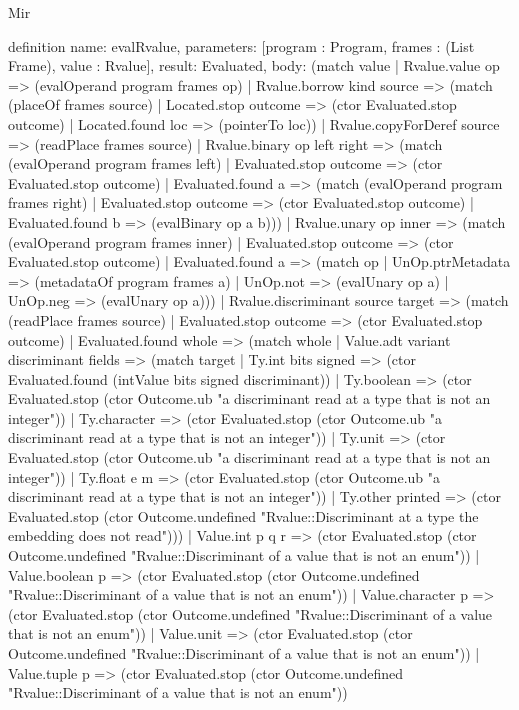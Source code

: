 \begin{lexlean}{Mir}
\begin{semanticmodule}
definition{
  name: evalRvalue,
  parameters: [program : Program, frames : (List Frame), value : Rvalue],
  result: Evaluated,
  body: (match value
    | Rvalue.value op => (evalOperand program frames op)
    | Rvalue.borrow kind source => (match (placeOf frames source)
      | Located.stop outcome => (ctor Evaluated.stop outcome)
      | Located.found loc => (pointerTo loc))
    | Rvalue.copyForDeref source => (readPlace frames source)
    | Rvalue.binary op left right => (match (evalOperand program frames left)
      | Evaluated.stop outcome => (ctor Evaluated.stop outcome)
      | Evaluated.found a => (match (evalOperand program frames right)
        | Evaluated.stop outcome => (ctor Evaluated.stop outcome)
        | Evaluated.found b => (evalBinary op a b)))
    | Rvalue.unary op inner => (match (evalOperand program frames inner)
      | Evaluated.stop outcome => (ctor Evaluated.stop outcome)
      | Evaluated.found a => (match op
        | UnOp.ptrMetadata => (metadataOf program frames a)
        | UnOp.not => (evalUnary op a)
        | UnOp.neg => (evalUnary op a)))
    | Rvalue.discriminant source target => (match (readPlace frames source)
      | Evaluated.stop outcome => (ctor Evaluated.stop outcome)
      | Evaluated.found whole => (match whole
        | Value.adt variant discriminant fields => (match target
          | Ty.int bits signed => (ctor Evaluated.found (intValue bits signed discriminant))
          | Ty.boolean => (ctor Evaluated.stop (ctor Outcome.ub "a discriminant read at a type that is not an integer"))
          | Ty.character => (ctor Evaluated.stop (ctor Outcome.ub "a discriminant read at a type that is not an integer"))
          | Ty.unit => (ctor Evaluated.stop (ctor Outcome.ub "a discriminant read at a type that is not an integer"))
          | Ty.float e m => (ctor Evaluated.stop (ctor Outcome.ub "a discriminant read at a type that is not an integer"))
          | Ty.other printed => (ctor Evaluated.stop (ctor Outcome.undefined "Rvalue::Discriminant at a type the embedding does not read")))
        | Value.int p q r => (ctor Evaluated.stop (ctor Outcome.undefined "Rvalue::Discriminant of a value that is not an enum"))
        | Value.boolean p => (ctor Evaluated.stop (ctor Outcome.undefined "Rvalue::Discriminant of a value that is not an enum"))
        | Value.character p => (ctor Evaluated.stop (ctor Outcome.undefined "Rvalue::Discriminant of a value that is not an enum"))
        | Value.unit => (ctor Evaluated.stop (ctor Outcome.undefined "Rvalue::Discriminant of a value that is not an enum"))
        | Value.tuple p => (ctor Evaluated.stop (ctor Outcome.undefined "Rvalue::Discriminant of a value that is not an enum"))
}
\end{semanticmodule}
\end{lexlean}
